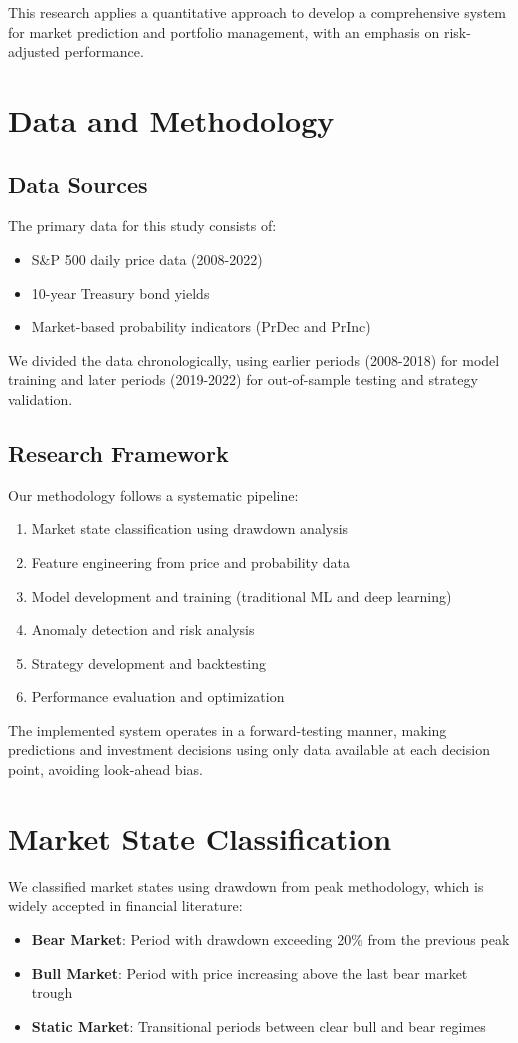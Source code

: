 \documentclass[10pt]{article}
\begin{document}
This research applies a quantitative approach to develop a comprehensive system for market prediction and portfolio management, with an emphasis on risk-adjusted performance.

\section{Data and Methodology}
\subsection{Data Sources}
The primary data for this study consists of:
\begin{itemize}
    \item S\&P 500 daily price data (2008-2022)
    \item 10-year Treasury bond yields
    \item Market-based probability indicators (PrDec and PrInc)
\end{itemize}

We divided the data chronologically, using earlier periods (2008-2018) for model training and later periods (2019-2022) for out-of-sample testing and strategy validation.

\subsection{Research Framework}
Our methodology follows a systematic pipeline:
\begin{enumerate}
    \item Market state classification using drawdown analysis
    \item Feature engineering from price and probability data
    \item Model development and training (traditional ML and deep learning)
    \item Anomaly detection and risk analysis
    \item Strategy development and backtesting
    \item Performance evaluation and optimization
\end{enumerate}

The implemented system operates in a forward-testing manner, making predictions and investment decisions using only data available at each decision point, avoiding look-ahead bias.

\section{Market State Classification}
We classified market states using drawdown from peak methodology, which is widely accepted in financial literature:
\begin{itemize}
    \item \textbf{Bear Market}: Period with drawdown exceeding 20\% from the previous peak
    \item \textbf{Bull Market}: Period with price increasing above the last bear market trough
    \item \textbf{Static Market}: Transitional periods between clear bull and bear regimes
\end{itemize}
\end{document}
